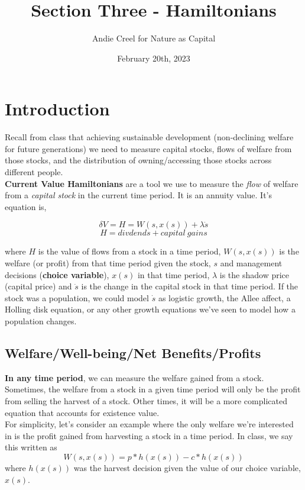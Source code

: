 \documentclass{article}
\title{Section Three - Hamiltonians}
\author{Andie Creel for Nature as Capital}
\date{February 20th, 2023}
\begin{document}
\maketitle

\section{Introduction}
Recall from class that achieving sustainable development (non-declining welfare for future generations) we need to measure capital stocks, flows of welfare from those stocks, and the distribution of owning/accessing those stocks across different people. \\

\textbf{Current Value Hamiltonians} are a tool we use to measure the \textit{flow} of welfare from a \textit{capital stock} in the current time period. It is an annuity value. It's equation is,

$$\delta V = H = W(s, x(s)) + \lambda \dot s$$
$$ H = divdends + capital\ gains$$

 where $H$ is the value of flows from a stock in a time period, $W(s, x(s))$ is the welfare (or profit) from that time period given the stock, $s$ and management decisions (\textbf{choice variable}), $x(s)$ in that time period, $\lambda$ is the shadow price (capital price) and $\dot s$ is the change in the capital stock in that time period. If the stock was a population, we could model $\dot s$ as logistic growth, the Allee affect, a Holling disk equation, or any other growth equations we've seen to model how a population changes. 

\subsection{Welfare/Well-being/Net Benefits/Profits}

\textbf{In any time period}, we can measure the welfare gained from a stock. Sometimes, the welfare from a stock in a given time period will only be the profit from selling the harvest of a stock. Other times, it will be a more complicated equation that accounts for existence value. \\

For simplicity, let's consider an example where the only welfare we're interested in is the profit gained from harvesting a stock in a time period. In class, we say this written as  
$$W(s, x(s)) = p*h(x(s)) - c * h(x(s)) $$
where $h(x(s))$ was the harvest decision given the value of our choice variable, $x(s)$. \\
\end{document}
